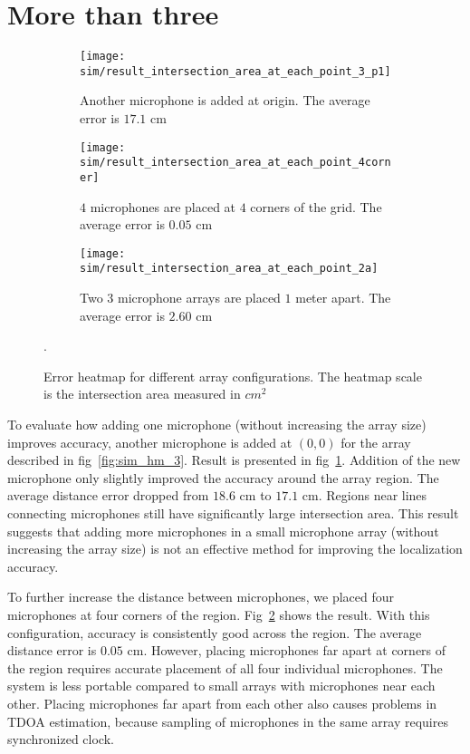 \section{More than three}

\begin{figure*}[h!]
  \centering
  \begin{subfigure}[]{.48\textwidth}
    \texttt{[image: sim/result\_intersection\_area\_at\_each\_point\_3\_p1]}
    \caption{Another microphone is added at origin. The average error is $17.1$ cm}
    \label{fig:sim_hm_3_p1}
  \end{subfigure}
  \begin{subfigure}[]{.48\textwidth}
    \texttt{[image: sim/result\_intersection\_area\_at\_each\_point\_4corner]}
    \caption{$4$ microphones are placed at $4$ corners of the grid. The average error is $0.05$ cm}
    \label{fig:sim_hm_4}
  \end{subfigure}
  \begin{subfigure}[]{.48\textwidth}
    \texttt{[image: sim/result\_intersection\_area\_at\_each\_point\_2a]}
    \caption{Two $3$ microphone arrays are placed $1$ meter apart. The average error is $2.60$ cm}
    \label{fig:sim_hm_2_array}
  \end{subfigure}
  \caption{Error heatmap for different array configurations. The heatmap scale is the intersection area measured in $cm^2$}.
\end{figure*}

To evaluate how adding one microphone (without increasing the array size) improves accuracy, another microphone is added at $(0,0)$ for the array described in fig~\ref{fig:sim_hm_3}. Result is presented in fig~\ref{fig:sim_hm_3_p1}. Addition of the new microphone only slightly improved the accuracy around the array region. The average distance error dropped from $18.6$ cm to $17.1$ cm. Regions near lines connecting microphones still have significantly large intersection area. This result suggests that adding more microphones in a small microphone array (without increasing the array size) is not an effective method for improving the localization accuracy.

To further increase the distance between microphones, we placed four microphones at four corners of the region. Fig~\ref{fig:sim_hm_4} shows the result. With this configuration, accuracy is consistently good across the region. The average distance error is $0.05$ cm.  However, placing microphones far apart at corners of the region requires accurate placement of all four individual microphones. The system is less portable compared to small arrays with microphones near each other. Placing microphones far apart from each other also causes problems in TDOA estimation, because sampling of microphones in the same array requires synchronized clock.

